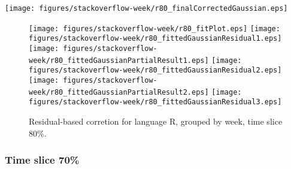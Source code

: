 \begin{center}
{\texttt{[image: figures/stackoverflow-week/r80\_finalCorrectedGaussian.eps]}}
\end{center}

\FloatBarrier

\begin{figure}[t]
\centering
{}
{\texttt{[image: figures/stackoverflow-week/r80\_fitPlot.eps]}}
{\texttt{[image: figures/stackoverflow-week/r80\_fittedGaussianResidual1.eps]}}
{\texttt{[image: figures/stackoverflow-week/r80\_fittedGaussianPartialResult1.eps]}}
{\texttt{[image: figures/stackoverflow-week/r80\_fittedGaussianResidual2.eps]}}
{\texttt{[image: figures/stackoverflow-week/r80\_fittedGaussianPartialResult2.eps]}}
{\texttt{[image: figures/stackoverflow-week/r80\_fittedGaussianResidual3.eps]}}
\caption{Residual-based corretion for language R, grouped by week, time slice 80\%.}
\end{figure}


\FloatBarrier


\subsubsection{Time slice 70\%}


